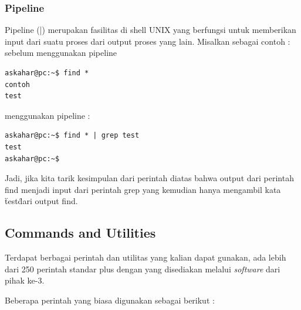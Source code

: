 \subsubsection{Pipeline}
Pipeline (|) merupakan fasilitas di shell UNIX yang berfungsi untuk memberikan input dari suatu proses dari output proses
yang lain. Misalkan sebagai contoh :
sebelum menggunakan pipeline
\begin{verbatim}
askahar@pc:~$ find *
contoh
test
\end{verbatim}

menggunakan pipeline :
\begin{verbatim}
askahar@pc:~$ find * | grep test
test
askahar@pc:~$
\end{verbatim}
Jadi, jika kita tarik kesimpulan dari perintah diatas bahwa output dari perintah find menjadi input dari perintah grep yang kemudian hanya mengambil kata \"test\" dari output find.


\subsection{Commands and Utilities}
Terdapat berbagai perintah dan utilitas yang kalian dapat gunakan, ada lebih dari 250 perintah standar plus dengan yang disediakan melalui \textit{software} dari pihak ke-3. 

Beberapa perintah yang biasa digunakan sebagai berikut :

